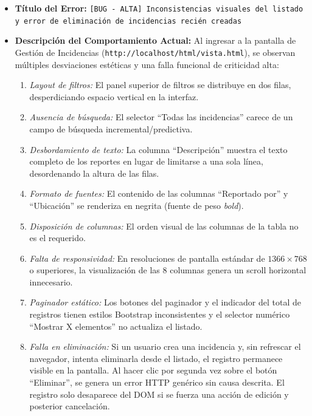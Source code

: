 \begin{itemize}
    \item \textbf{Título del Error:} \texttt{[BUG - ALTA] Inconsistencias visuales del listado y error de eliminación de incidencias recién creadas}
    \item \textbf{Descripción del Comportamiento Actual:}
    Al ingresar a la pantalla de Gestión de Incidencias (\texttt{http://localhost/html/vista.html}), se observan múltiples desviaciones estéticas y una falla funcional de criticidad alta:
    \begin{enumerate}
        \item \textit{Layout de filtros:} El panel superior de filtros se distribuye en dos filas, desperdiciando espacio vertical en la interfaz.
        \item \textit{Ausencia de búsqueda:} El selector ``Todas las incidencias'' carece de un campo de búsqueda incremental/predictiva.
        \item \textit{Desbordamiento de texto:} La columna ``Descripción'' muestra el texto completo de los reportes en lugar de limitarse a una sola línea, desordenando la altura de las filas.
        \item \textit{Formato de fuentes:} El contenido de las columnas ``Reportado por'' y ``Ubicación'' se renderiza en negrita (fuente de peso \textit{bold}).
        \item \textit{Disposición de columnas:} El orden visual de las columnas de la tabla no es el requerido.
        \item \textit{Falta de responsividad:} En resoluciones de pantalla estándar de $1366\times768$ o superiores, la visualización de las 8 columnas genera un scroll horizontal innecesario.
        \item \textit{Paginador estático:} Los botones del paginador y el indicador del total de registros tienen estilos Bootstrap inconsistentes y el selector numérico ``Mostrar X elementos'' no actualiza el listado.
        \item \textit{Falla en eliminación:} Si un usuario crea una incidencia y, sin refrescar el navegador, intenta eliminarla desde el listado, el registro permanece visible en la pantalla. Al hacer clic por segunda vez sobre el botón ``Eliminar'', se genera un error HTTP genérico sin causa descrita. El registro solo desaparece del DOM si se fuerza una acción de edición y posterior cancelación.
    \end{enumerate}
    

\end{itemize}

